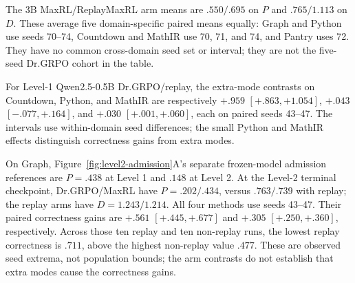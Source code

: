 The 3B MaxRL/ReplayMaxRL arm means are $.550/.695$ on $P$ and
$.765/1.113$ on $D$. These average five domain-specific paired means
equally: Graph and Python use seeds 70--74, Countdown and MathIR use
70, 71, and 74, and Pantry uses 72. They have no common cross-domain seed
set or interval; they are not the five-seed Dr.GRPO cohort in the table.

For Level-1 Qwen2.5-0.5B Dr.GRPO/replay, the extra-mode contrasts on
Countdown, Python, and MathIR are respectively $+.959$ $[+.863,+1.054]$,
$+.043$ $[-.077,+.164]$, and $+.030$ $[+.001,+.060]$, each on paired
seeds 43--47. The intervals use within-domain seed differences; the small
Python and MathIR effects distinguish correctness gains from extra modes.

On Graph, Figure~\ref{fig:level2-admission}A's separate frozen-model
admission references are $P=.438$ at Level 1 and $.148$ at Level 2.
At the Level-2 terminal checkpoint, Dr.GRPO/MaxRL have $P=.202/.434$,
versus $.763/.739$ with replay; the replay arms have $D=1.243/1.214$.
All four methods use seeds 43--47. Their paired correctness gains are
$+.561$ $[+.445,+.677]$ and $+.305$ $[+.250,+.360]$, respectively.
Across those ten replay and ten non-replay runs, the lowest replay
correctness is $.711$, above the highest non-replay value $.477$.
These are observed seed extrema, not population bounds; the arm contrasts
do not establish that extra modes cause the correctness gains.
